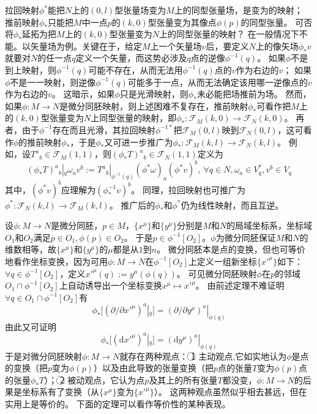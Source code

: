 \begin{note}
拉回映射$\phi^*$能把$N$上的$(0, l)$型张量场变为$M$上的同型张量场，是变为的映射；
推前映射$\phi_*$只能把$M$中一点$p$的$(k, 0)$型张量变为其像点$\phi(p)$的同型张量。
可否将$\phi_*$延拓为把$M$上的$(k, 0)$型张量变为$N$上的同型张量的映射？
在一般情况下不能。以矢量场为例。关键在于，给定$M$上一个矢量场$v$后，要定义$N$上的像矢场$\phi_*v$就要对$N$的任一点$q$定义一个矢量，而这势必涉及$q$点的逆像$\phi^{-1}(q)$。
如果$\phi$不是到上映射，则$\phi^{-1}(q)$可能不存在，从而无法用$\phi^{-1}(q)$点的$v$作为右边的$v$；
如果$\phi$不是一一映射，则逆像$\phi^{-1}(q)$可能多于一点，从而无法确定该用哪一逆像点的$v$作为右边的$v$。
这暗示，如果$\phi$只是光滑映射，则$\phi_*$未必能把场推前为场。
然而，如果$\phi \colon M \to N$是微分同胚映射，则上述困难不复存在，推前映射$\phi_*$可看作把$M$上的$(k, 0)$型张量变为$N$上同型张量的映射，即$\phi_* \colon \mathscr{F}_M(k, 0) \to \mathscr{F}_N(k, 0)$。
再者，由于$\phi^{-1}$存在而且光滑，其拉回映射$\phi^{-1*}$把$\mathscr{F}_M(0, l)$映到$\mathscr{F}_N(0, l)$，这可看作$\phi$的推前映射$\phi_*$，于是$\phi_*$又可进一步推广为$\phi_* \colon \mathscr{F}_M(k, l) \to \mathscr{F}_N(k, l)$。
例如，设$T^a{}_b \in \mathscr{F}_M(1, 1)$，则$(\phi_*T)^a{}_b \in \mathscr{F}_N(1, 1)$定义为
$$(\phi_*T)^a{}_b|_q\omega_av^b := T^a{}_b|_{\phi^{-1}(q)}(\phi^*\omega)_a(\phi^*v)^b, ~ \forall q \in N, \omega_a \in V^*_q, v^b \in V_q$$
其中，$(\phi^*v)^b$应理解为$(\phi^{-1}_*v)^b$。
同理，拉回映射也可推广为$\phi^* \colon \mathscr{F}_N(k, l) \to \mathscr{F}_M(k, l)$。
推广后的$\phi_*$和$\phi^*$仍为线性映射，而且互逆。
\end{note}

设$\phi \colon M \to N$是微分同胚，$p \in M$，$\{x^\mu\}$和$\{y^\mu\}$分别是$M$和$N$的局域坐标系，坐标域$O_1$和$O_2$满足$p \in O_1, \phi(p) \in O_2$。
于是$p \in \phi^{-1}[O_2]$。$\phi$为微分同胚保证$M$和$N$的维数相等，故$\{x^\mu\}$和$\{y^\mu\}$的$\mu$都是从$1$到$n$。
微分同胚本是点的变换，但也可等价地看作坐标变换，因为可用$\phi \colon M \to N$在$\phi^{-1}[O_2]$上定义一组新坐标$\{x'^\mu\}$如下：
$\forall q \in \phi^{-1}[O_2]$，定义$x'^\mu(q) := y^\mu(\phi(q))$。
可见微分同胚映射$\phi$在$p$的邻域$O_1 \cap \phi^{-1}[O_2]$上自动诱导出一个坐标变换$x^\mu \mapsto x'^\mu$。
由前述定理不难证明$\forall q \in O_1 \cap \phi^{-1}[O_2]$有
$$\phi_*[(\partial / \partial x'^\mu)^a|_q] = (\partial / \partial y^\mu)^a|_{\phi(q)}$$
由此又可证明
$$\phi_*[(\mathrm{d}x'^\mu)^a|_q] = (\mathrm{d}y^\mu)^a|_{\phi(q)}$$
于是对微分同胚映射$\phi \colon M \to N$就存在两种观点：
\textcircled{1} 主动观点,它如实地认为$\phi$是点的变换（把$p$变为$\phi(p)$）以及由此导致的张量变换（把$p$点的张量$T$变为$\phi(p)$点的张量$\phi_*T$）；
\textcircled{2} 被动观点，它认为点$p$及其上的所有张量$T$都没变，$\phi \colon M \to N$的后果是坐标系有了变换（从$\{x^\mu\}$变为$\{x'^\mu\}$）。
这两种观点虽然似乎相去甚远，但在实用上是等价的。
下面的定理可以看作等价性的某种表现。

